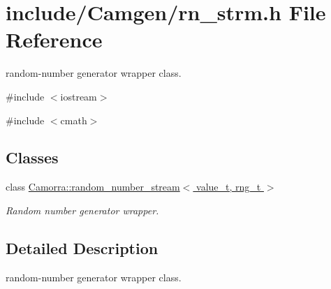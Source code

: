 \hypertarget{a00623}{
\section{include/Camgen/rn\_\-strm.h File Reference}
\label{a00623}
}


random-\/number generator wrapper class.  


{\ttfamily \#include $<$iostream$>$}\par
{\ttfamily \#include $<$cmath$>$}\par
\subsection*{Classes}
\begin{DoxyCompactItemize}
\item 
class \hyperlink{a00458}{Camorra::random\_\-number\_\-stream$<$ value\_\-t, rng\_\-t $>$}
\begin{DoxyCompactList}\small\item\em Random number generator wrapper. \end{DoxyCompactList}\end{DoxyCompactItemize}


\subsection{Detailed Description}
random-\/number generator wrapper class. 